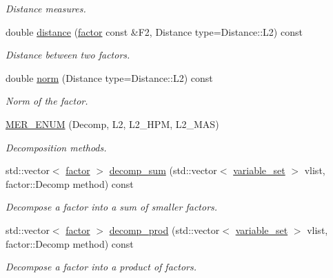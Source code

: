 \begin{DoxyCompactItemize}
\begin{DoxyCompactList}\small\item\em Distance measures. \end{DoxyCompactList}\item 
double \hyperlink{classmerlin_1_1factor_a7a24a413fff9a72ec7be2be294ff5680}{distance} (\hyperlink{classmerlin_1_1factor}{factor} const \&F2, Distance type=Distance\+::\+L2) const 
\begin{DoxyCompactList}\small\item\em Distance between two factors. \end{DoxyCompactList}\item 
double \hyperlink{classmerlin_1_1factor_a4815b5dd93901a617bb9a640f116744c}{norm} (Distance type=Distance\+::\+L2) const 
\begin{DoxyCompactList}\small\item\em Norm of the factor. \end{DoxyCompactList}\item 
\hypertarget{classmerlin_1_1factor_aa0e40deff2eda192ddbc515ce327a43a}{}\hyperlink{classmerlin_1_1factor_aa0e40deff2eda192ddbc515ce327a43a}{M\+E\+R\+\_\+\+E\+N\+U\+M} (Decomp, L2, L2\+\_\+\+H\+P\+M, L2\+\_\+\+M\+A\+S)\label{classmerlin_1_1factor_aa0e40deff2eda192ddbc515ce327a43a}

\begin{DoxyCompactList}\small\item\em Decomposition methods. \end{DoxyCompactList}\item 
std\+::vector$<$ \hyperlink{classmerlin_1_1factor}{factor} $>$ \hyperlink{classmerlin_1_1factor_a581a10c7204e2e5a324140c686d2eed8}{decomp\+\_\+sum} (std\+::vector$<$ \hyperlink{classmerlin_1_1variable__set}{variable\+\_\+set} $>$ vlist, factor\+::\+Decomp method) const 
\begin{DoxyCompactList}\small\item\em Decompose a factor into a sum of smaller factors. \end{DoxyCompactList}\item 
std\+::vector$<$ \hyperlink{classmerlin_1_1factor}{factor} $>$ \hyperlink{classmerlin_1_1factor_a65319f96f91c312f779e1bcab9dd36bc}{decomp\+\_\+prod} (std\+::vector$<$ \hyperlink{classmerlin_1_1variable__set}{variable\+\_\+set} $>$ vlist, factor\+::\+Decomp method) const 
\begin{DoxyCompactList}\small\item\em Decompose a factor into a product of factors. \end{DoxyCompactList}\end{DoxyCompactItemize}
